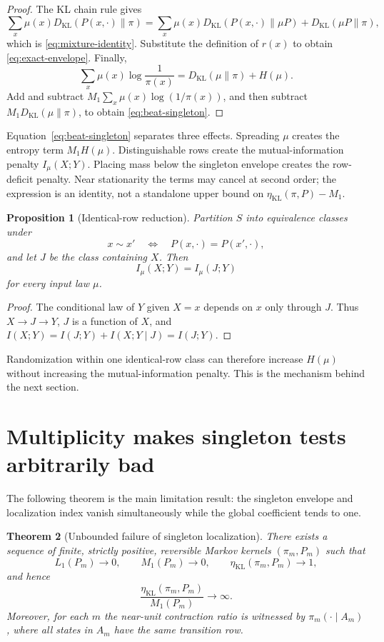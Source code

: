 \documentclass[11pt]{article}
\newtheorem{theorem}{Theorem}[section]
\newtheorem{proposition}[theorem]{Proposition}
\newcommand{\KL}{D_{\mathrm{KL}}}
\newcommand{\etaKL}{\eta_{\mathrm{KL}}}
\newcommand{\etaStat}{\eta_{\mathrm{KL}}(\pi,P)}
\newcommand{\Mone}{M_1}
\newcommand{\Lone}{L_1}
\begin{document}
\begin{proof}
The KL chain rule gives
\[
  \sum_x\mu(x)\KL(P(x,\cdot)\|\pi)
  =
  \sum_x\mu(x)\KL(P(x,\cdot)\|\mu P)
  +\KL(\mu P\|\pi),
\]
which is \eqref{eq:mixture-identity}.  Substitute the definition of
\(r(x)\) to obtain \eqref{eq:exact-envelope}.  Finally,
\[
  \sum_x\mu(x)\log\frac1{\pi(x)}
  =\KL(\mu\|\pi)+H(\mu).
\]
Add and subtract
\(\Mone\sum_x\mu(x)\log(1/\pi(x))\), and then subtract
\(\Mone\KL(\mu\|\pi)\), to obtain \eqref{eq:beat-singleton}.
\end{proof}

Equation~\eqref{eq:beat-singleton} separates three effects.  Spreading
\(\mu\) creates the entropy term \(\Mone H(\mu)\).  Distinguishable rows
create the mutual-information penalty \(I_\mu(X;Y)\).  Placing mass below
the singleton envelope creates the row-deficit penalty.  Near stationarity
the terms may cancel at second order; the expression is an identity, not
a standalone upper bound on \(\etaStat-\Mone\).

\begin{proposition}[Identical-row reduction]
\label{prop:row-equivalence}
Partition \(S\) into equivalence classes under
\[
  x\sim x'
  \quad\Longleftrightarrow\quad
  P(x,\cdot)=P(x',\cdot),
\]
and let \(J\) be the class containing \(X\).  Then
\[
  I_\mu(X;Y)=I_\mu(J;Y)
\]
for every input law \(\mu\).
\end{proposition}

\begin{proof}
The conditional law of \(Y\) given \(X=x\) depends on \(x\) only through
\(J\).  Thus \(X\to J\to Y\), \(J\) is a function of \(X\), and
\(I(X;Y)=I(J;Y)+I(X;Y\mid J)=I(J;Y)\).
\end{proof}

Randomization within one identical-row class can therefore increase
\(H(\mu)\) without increasing the mutual-information penalty.  This is the
mechanism behind the next section.


\section{Multiplicity makes singleton tests arbitrarily bad}
\label{sec:multiplicity}

The following theorem is the main limitation result: the singleton envelope
and localization index vanish simultaneously while the global coefficient
tends to one.

\begin{theorem}[Unbounded failure of singleton localization]
\label{thm:unbounded-separation}
There exists a sequence of finite, strictly positive, reversible Markov
kernels \((\pi_m,P_m)\) such that
\[
  \Lone(P_m)\longrightarrow0,\qquad
  \Mone(P_m)\longrightarrow0,\qquad
  \etaKL(\pi_m,P_m)\longrightarrow1,
\]
and hence
\[
  \frac{\etaKL(\pi_m,P_m)}{\Mone(P_m)}
  \longrightarrow\infty.
\]
Moreover, for each \(m\) the near-unit contraction ratio is witnessed by
\(\pi_m(\cdot\mid A_m)\), where all states in \(A_m\) have the same
transition row.
\end{theorem}
\end{document}
